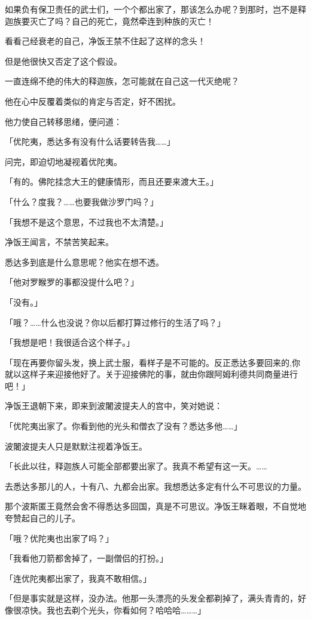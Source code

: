 \documentclass[twoside,openany]{book}
\begin{document}
如果负有保卫责任的武士们，一个个都出家了，那该怎么办呢？到那时，岂不是释迦族要灭亡了吗？自己的死亡，竟然牵连到种族的灭亡！

看看己经衰老的自己，净饭王禁不住起了这样的念头！

但是他很快又否定了这个假设。

一直连绵不绝的伟大的释迦族，怎可能就在自己这一代灭绝呢？

他在心中反覆着类似的肯定与否定，好不困扰。

他力使自己转移思绪，便问道：

「优陀夷，悉达多有没有什么话要转告我……」

问完，即迫切地凝视着优陀夷。

「有的。佛陀挂念大王的健康情形，而且还要来渡大王。」

「什么？度我？……也要我做沙罗门吗？」

「我想不是这个意思，不过我也不太清楚。」

净饭王闻言，不禁苦笑起来。

悉达多到底是什么意思呢？他实在想不透。

「他对罗睺罗的事都没提什么吧？」

「没有。」

「哦？……什么也没说？你以后都打算过修行的生活了吗？」

「我想是吧！我很适合这个样子。」

「现在再要你留头发，换上武士服，看样子是不可能的。反正悉达多要回来的,你就以这样子来迎接他好了。关于迎接佛陀的事，就由你跟阿姆利德共同商量进行吧！」

净饭王退朝下来，即来到波闍波提夫人的宫中，笑对她说：

「优陀夷出家了。你看到他的光头和僧衣了没有？悉达多他……」

波闍波提夫人只是默默注视着净饭王。

「长此以往，释迦族人可能全部都要出家了。我真不希望有这一天。……

去悉达多那儿的人，十有八、九都会出家。我想悉达多定有什么不可思议的力量。

那个波斯匿王竟然会舍不得悉达多回国，真是不可思议。净饭王眯着眼，不自觉地夸赞起自己的儿子。

「哦？优陀夷也出家了吗？」

「我看他刀箭都舍掉了，一副僧侣的打扮。」

「连优陀夷都出家了，我真不敢相信。」

「但是事实就是这样，没办法。他那一头漂亮的头发全都剃掉了，满头青青的，好像很凉快。我也去剃个光头，你看如何？哈哈哈………」
\end{document}
